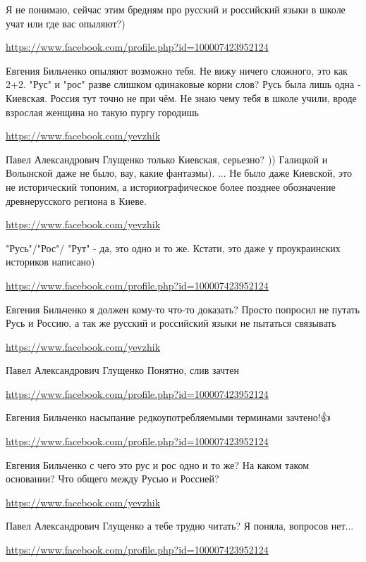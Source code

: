 \documentclass[a4paper,11pt]{extreport}
\begin{document}
\begin{itemize}
\begin{itemize}
Я не понимаю, сейчас этим бредням про русский и российский языки в школе учат или где вас опыляют?)

\url{https://www.facebook.com/profile.php?id=100007423952124}

Евгения Бильченко опыляют возможно тебя. Не вижу ничего сложного, это как 2+2. "Рус" и "рос" разве слишком одинаковые корни слов?
Русь была лишь одна - Киевская. Россия тут точно не при чём. Не знаю чему тебя в школе учили, вроде взрослая женщина но такую пургу городишь🤣

\url{https://www.facebook.com/yevzhik}

Павел Александрович Глущенко только Киевская, серьезно? )) Галицкой и Волынской даже не было, вау, какие фантазмы). ... Не было даже Киевской, это не исторический топоним, а историографическое более позднее обозначение древнерусского региона в Киеве.

\url{https://www.facebook.com/yevzhik}

"Русь"/"Рос"/ "Рут" - да, это одно и то же. Кстати, это даже у проукраинских историков написано)

\url{https://www.facebook.com/profile.php?id=100007423952124}

Евгения Бильченко я должен кому-то что-то доказать? Просто попросил не путать Русь и Россию, а так же русский и российский языки не пытаться связывать

\url{https://www.facebook.com/yevzhik}

Павел Александрович Глущенко Понятно, слив зачтен

\url{https://www.facebook.com/profile.php?id=100007423952124}

Евгения Бильченко насыпание редкоупотребляемыми терминами зачтено!👍

\url{https://www.facebook.com/profile.php?id=100007423952124}

Евгения Бильченко с чего это рус и рос одно и то же? На каком таком основании? Что общего между Русью и Россией?

\url{https://www.facebook.com/yevzhik}

Павел Александрович Глущенко а тебе трудно читать? Я поняла, вопросов нет...

\url{https://www.facebook.com/profile.php?id=100007423952124}


\end{itemize}
\end{itemize}
\end{document}
